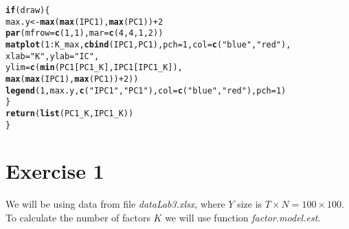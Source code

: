 \documentclass[12pt, a4paper]{article}\usepackage[]{graphicx}\usepackage[]{color}
\makeatletter
\newcommand{\hlnum}[1]{\textcolor[rgb]{0.686,0.059,0.569}{#1}}%
\newcommand{\hlstr}[1]{\textcolor[rgb]{0.192,0.494,0.8}{#1}}%
\newcommand{\hlopt}[1]{\textcolor[rgb]{0,0,0}{#1}}%
\newcommand{\hlstd}[1]{\textcolor[rgb]{0.345,0.345,0.345}{#1}}%
\newcommand{\hlkwa}[1]{\textcolor[rgb]{0.161,0.373,0.58}{\textbf{#1}}}%
\newcommand{\hlkwb}[1]{\textcolor[rgb]{0.69,0.353,0.396}{#1}}%
\newcommand{\hlkwc}[1]{\textcolor[rgb]{0.333,0.667,0.333}{#1}}%
\newcommand{\hlkwd}[1]{\textcolor[rgb]{0.737,0.353,0.396}{\textbf{#1}}}%
\newenvironment{kframe}{%
 \def\at@end@of@kframe{}%
 \ifinner\ifhmode%
  \def\at@end@of@kframe{\end{minipage}}%
  \begin{minipage}{\columnwidth}%
 \fi\fi%
 \def\FrameCommand##1{\hskip\@totalleftmargin \hskip-\fboxsep
 \colorbox{shadecolor}{##1}\hskip-\fboxsep
     \hskip-\linewidth \hskip-\@totalleftmargin \hskip\columnwidth}%
 \MakeFramed {\advance\hsize-\width
   \@totalleftmargin\z@ \linewidth\hsize
   \@setminipage}}%
 {\par\unskip\endMakeFramed%
 \at@end@of@kframe}
\newenvironment{knitrout}{}{} %
\makeatother
\begin{document}
\begin{knitrout}
\begin{kframe}
\begin{alltt}
    \hlkwa{if} \hlstd{(draw) \{}
      \hlstd{max.y} \hlkwb{<-} \hlkwd{max}\hlstd{(}\hlkwd{max}\hlstd{(IPC1),} \hlkwd{max}\hlstd{(PC1))} \hlopt{+} \hlnum{2}
      \hlkwd{par}\hlstd{(}\hlkwc{mfrow} \hlstd{=} \hlkwd{c}\hlstd{(}\hlnum{1}\hlstd{,}\hlnum{1}\hlstd{),} \hlkwc{mar}\hlstd{=}\hlkwd{c}\hlstd{(}\hlnum{4}\hlstd{,}\hlnum{4}\hlstd{,}\hlnum{1}\hlstd{,}\hlnum{2}\hlstd{))}
      \hlkwd{matplot}\hlstd{(}\hlnum{1}\hlopt{:}\hlstd{K_max,} \hlkwd{cbind}\hlstd{(IPC1, PC1),} \hlkwc{pch}\hlstd{=}\hlnum{1}\hlstd{,} \hlkwc{col}\hlstd{=}\hlkwd{c}\hlstd{(}\hlstr{"blue"}\hlstd{,} \hlstr{"red"}\hlstd{),}
              \hlkwc{xlab}\hlstd{=}\hlstr{"K"}\hlstd{,} \hlkwc{ylab}\hlstd{=}\hlstr{"IC"}\hlstd{,}
              \hlkwc{ylim} \hlstd{=} \hlkwd{c}\hlstd{(}\hlkwd{min}\hlstd{(PC1[PC1_K],IPC1[IPC1_K]),}
                       \hlkwd{max}\hlstd{(}\hlkwd{max}\hlstd{(IPC1),}\hlkwd{max}\hlstd{(PC1))}\hlopt{+}\hlnum{2}\hlstd{))}
      \hlkwd{legend}\hlstd{(}\hlnum{1}\hlstd{, max.y,} \hlkwd{c}\hlstd{(}\hlstr{"IPC1"}\hlstd{,} \hlstr{"PC1"}\hlstd{),} \hlkwc{col} \hlstd{=} \hlkwd{c}\hlstd{(}\hlstr{"blue"}\hlstd{,} \hlstr{"red"}\hlstd{),} \hlkwc{pch}\hlstd{=}\hlnum{1}\hlstd{)}
    \hlstd{\}}
    \hlkwd{return} \hlstd{(}\hlkwd{list}\hlstd{(PC1_K, IPC1_K))}
  \hlstd{\}}
\end{alltt}
\end{kframe}
\end{knitrout}

\section{Exercise 1}
We will be using data from file \textit{dataLab3.xlsx}, where $Y$ size is $T\times N = 100\times 100$.
To calculate the number of factors $K$ we will use function \textit{factor.model.est}.
\end{document}
